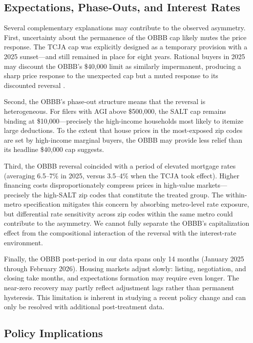 \documentclass[12pt]{article}
\begin{document}
\subsection{Expectations, Phase-Outs, and Interest Rates}

Several complementary explanations may contribute to the observed asymmetry. First, uncertainty about the permanence of the OBBB cap likely mutes the price response. The TCJA cap was explicitly designed as a temporary provision with a 2025 sunset---and still remained in place for eight years. Rational buyers in 2025 may discount the OBBB's \$40,000 limit as similarly impermanent, producing a sharp price response to the unexpected cap but a muted response to its discounted reversal \citep{RotembergBleakley2019, Lucca2017}.

Second, the OBBB's phase-out structure means that the reversal is heterogeneous. For filers with AGI above \$500,000, the SALT cap remains binding at \$10,000---precisely the high-income households most likely to itemize large deductions. To the extent that house prices in the most-exposed zip codes are set by high-income marginal buyers, the OBBB may provide less relief than its headline \$40,000 cap suggests.

Third, the OBBB reversal coincided with a period of elevated mortgage rates (averaging 6.5--7\% in 2025, versus 3.5--4\% when the TCJA took effect). Higher financing costs disproportionately compress prices in high-value markets---precisely the high-SALT zip codes that constitute the treated group. The within-metro specification mitigates this concern by absorbing metro-level rate exposure, but differential rate sensitivity across zip codes within the same metro could contribute to the asymmetry. We cannot fully separate the OBBB's capitalization effect from the compositional interaction of the reversal with the interest-rate environment.

Finally, the OBBB post-period in our data spans only 14 months (January 2025 through February 2026). Housing markets adjust slowly: listing, negotiation, and closing take months, and expectations formation may require even longer. The near-zero recovery may partly reflect adjustment lags rather than permanent hysteresis. This limitation is inherent in studying a recent policy change and can only be resolved with additional post-treatment data.

\subsection{Policy Implications}
\end{document}
